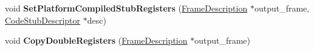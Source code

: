\begin{DoxyCompactItemize}
\item 
void {\bfseries Set\+Platform\+Compiled\+Stub\+Registers} (\hyperlink{classv8_1_1internal_1_1_frame_description}{Frame\+Description} $\ast$output\+\_\+frame, \hyperlink{classv8_1_1internal_1_1_code_stub_descriptor}{Code\+Stub\+Descriptor} $\ast$desc)\hypertarget{classv8_1_1internal_1_1_deoptimizer_a8166705d65e06947e8c8d300a676228f}{}\label{classv8_1_1internal_1_1_deoptimizer_a8166705d65e06947e8c8d300a676228f}

\item 
void {\bfseries Copy\+Double\+Registers} (\hyperlink{classv8_1_1internal_1_1_frame_description}{Frame\+Description} $\ast$output\+\_\+frame)\hypertarget{classv8_1_1internal_1_1_deoptimizer_a3aaeeba708fdc5438813f81d62c285b0}{}\label{classv8_1_1internal_1_1_deoptimizer_a3aaeeba708fdc5438813f81d62c285b0}

\end{DoxyCompactItemize}
